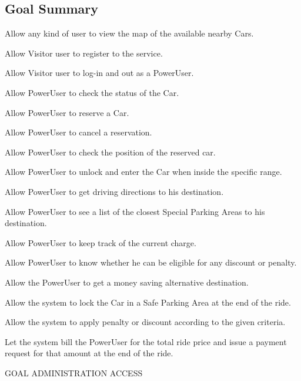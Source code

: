 \subsection{Goal Summary}
\begin{enumerate}[label={[}G\arabic*{]}]
\item Allow any kind of user to view the map of the available nearby Cars.
\item Allow Visitor user to register to the service.
\item Allow Visitor user to log-in and out as a PowerUser.
\item Allow PowerUser to check the status of the Car.
\item Allow PowerUser to reserve a Car.
\item Allow PowerUser to cancel a reservation.
\item Allow PowerUser to check the position of the reserved car.
\item Allow PowerUser to unlock and enter the Car when inside the specific range.
\item Allow PowerUser to get driving directions to his destination.
\item Allow PowerUser to see a list of the closest Special Parking Areas to his destination.
\item Allow PowerUser to keep track of the current charge. 
\item Allow PowerUser to know whether he can be eligible for any discount or penalty.
\item Allow the PowerUser to get a money saving alternative destination.
\item Allow the system to lock the Car in a Safe Parking Area at the end of the ride.
\item Allow the system to apply penalty or discount according to the given criteria.
\item Let the system bill the PowerUser for the total ride price and issue a payment request for that amount at the end of the ride.
\item GOAL ADMINISTRATION ACCESS
\end{enumerate}